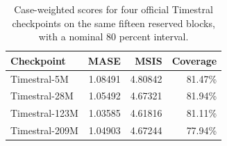 \begin{table}[htbp]\centering\small
\caption{Case-weighted scores for four official Timestral checkpoints on the same fifteen reserved blocks, with a nominal 80 percent interval.}\label{tab:timestral-scores}
\begin{tabular}{lrrr}\toprule Checkpoint & MASE & MSIS & Coverage\\\midrule
Timestral-5M & 1.08491 & 4.80842 & 81.47\% \\
Timestral-28M & 1.05492 & 4.67321 & 81.94\% \\
Timestral-123M & 1.03585 & 4.61816 & 81.11\% \\
Timestral-209M & 1.04903 & 4.67244 & 77.94\% \\
\bottomrule\end{tabular}
\end{table}
